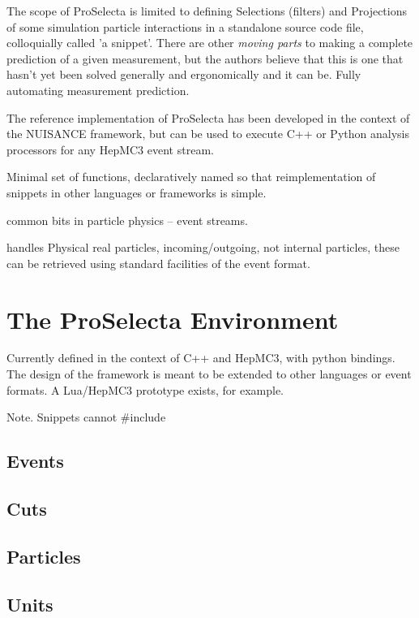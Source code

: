 \documentclass{SciPost}
\newcommand{\proselecta}{{\sc ProSelecta}}
\begin{document}
The scope of ProSelecta is limited to defining Selections (filters) and Projections of some simulation particle interactions in a standalone source code file, colloquially called 'a snippet'. There are other {\it moving parts} to making a complete prediction of a given measurement, but the authors believe that this is one that hasn't yet been solved generally and ergonomically and it can be. Fully automating measurement prediction.

The reference implementation of \proselecta{} has been developed in the context of the NUISANCE framework, but can be used to execute C++ or Python analysis  processors for any HepMC3 event stream.

Minimal set of functions, declaratively named so that reimplementation of snippets in other languages or frameworks is simple.


common bits in particle physics -- event streams.

handles Physical real particles, incoming/outgoing, not internal particles, these can be retrieved using standard facilities of the event format.

\section{The \proselecta{} Environment}
\label{sec:env}

Currently defined in the context of C++ and HepMC3, with python bindings. The design of the framework is meant to be extended to other languages or event formats. A Lua/HepMC3 prototype exists, for example.

Note. Snippets cannot \#include

\subsection{Events}

\subsection{Cuts}

\subsection{Particles}

\subsection{Units}
\end{document}

